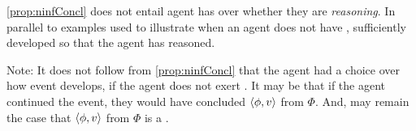 \begin{note}
  \autoref{prop:ninfConcl} does not entail agent has \ninf{} over whether they are \emph{reasoning}.
  In parallel to examples used to illustrate when an agent does not have \ninf{}, sufficiently developed so that the agent has reasoned.
\end{note}

\begin{note}
  Note:
  It does not follow from \autoref{prop:ninfConcl} that the agent had a choice over how event develops, if the agent does not exert \ninf{}.
  It may be that if the agent continued the event, they would have concluded \(\langle \phi, v \rangle\) from \(\Phi\).
  And, may remain the case that \(\langle \phi, v \rangle\) from \(\Phi\) is a \fc{}.
\end{note}

\section{}
\label{cha:requs:sec:definition}

